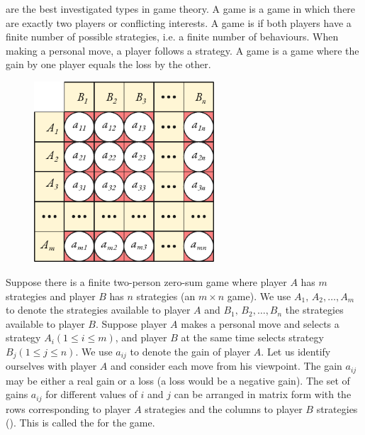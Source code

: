   are the best investigated types in game theory. A  game is a game in which there are exactly two players or conflicting interests. A game is  if both players have a finite number of possible strategies, i.e. a finite number of behaviours. When making a personal move, a player
follows a strategy. A  game is a game where the gain by one
player equals the loss by the other.

 \begin{figure}[!h]
 \centering
 \includegraphics[width=0.6\textwidth]{figures/two-player1.pdf}
 \end{figure}

Suppose there is a finite two-person zero-sum game where player
$A$ has $m$ strategies and player $B$ has $n$ strategies (an $m \times n$ game). We use $A_{1}, \, A_{2}, \ldots, A_{m}$ to denote the strategies available to player $A$ and $B_{1}, \, B_{2}, \ldots, B_{n}$ the strategies available to player $B$. Suppose player $A$ makes a personal move and selects a strategy $A_{i} (1 \leqslant i \leqslant m)$, and player $B$ at the same time selects strategy $B_{j} (1 \leqslant j \leqslant n)$. We use $a_{ij}$ to denote the gain of player $A$. Let us identify ourselves with player $A$ and consider each move from his viewpoint. The gain $a_{ij}$ may be either a real gain or a loss (a loss would be a negative gain). The set of gains $a_{ij}$ for different values of $i$ and $j$ can be arranged in matrix form with the rows corresponding to player $A$ strategies and the columns to player $B$ strategies (). This is called the  for the game.

